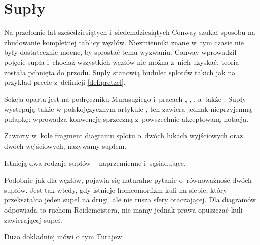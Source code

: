 \section{Supły}
\label{sec:tangle}
Na przełomie lat sześćdziesiątych i~siedemdziesiątych Conway szukał sposobu na zbudowanie kompletnej tablicy węzłów.
Niezmienniki znane w~tym czasie nie były dostatecznie mocne, by sprostać temu wyzwaniu.
Conway wprowadził pojęcie supła i~chociaż wszystkich węzłów nie można z~nich uzyskać, teoria została pchnięta do przodu.
Supły stanowią budulec splotów takich jak na przykład precle z~definicji \ref{def:pretzel}.

Sekcja oparta jest na podręczniku Murasugiego \cite{murasugi96} i~pracach \cite{conway70}, \cite{kauffman97}, \cite{kauffman04}, a~także \cite{schubert56}.
Supły występują także w polskojęzycznym artykule \cite{janiak04}, ten zawiera jednak nieprzyjemną pułapkę: wprowadza konwencję sprzeczną z~powszechnie akceptowaną notacją.

\begin{definition}[supeł]
    \label{def:tangle}
    Zawarty w~kole fragment diagramu splotu o~dwóch łukach wyjściowych oraz dwóch wejściowych, nazywamy supłem.
\end{definition}

Istnieją dwa rodzaje supłów -- naprzemienne i~sąsiadujące.


Podobnie jak dla węzłów, pojawia się naturalne pytanie o~równoważność dwóch supłów.
Jest tak wtedy, gdy istnieje homeomorfizm kuli na siebie, który przekształca jeden supeł na drugi, ale nie rusza sfery otaczającej.
Dla diagramów odpowiada to ruchom Reidemeistera, nie mamy jednak prawa opuszczać kuli zawierającej supeł.

Dużo dokładniej mówi o tym Turajew:

